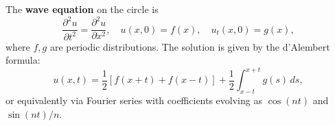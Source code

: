 The \textbf{wave equation} on the circle is
$$\frac{\partial^2 u}{\partial t^2} = \frac{\partial^2 u}{\partial x^2}, \quad u(x, 0) = f(x), \quad u_t(x, 0) = g(x),$$
where $f, g$ are periodic distributions. The solution is given by the d'Alembert formula:
$$u(x, t) = \frac{1}{2}[f(x+t) + f(x-t)] + \frac{1}{2} \int_{x-t}^{x+t} g(s) \, ds,$$
or equivalently via Fourier series with coefficients evolving as $\cos(nt)$ and $\sin(nt)/n$.
